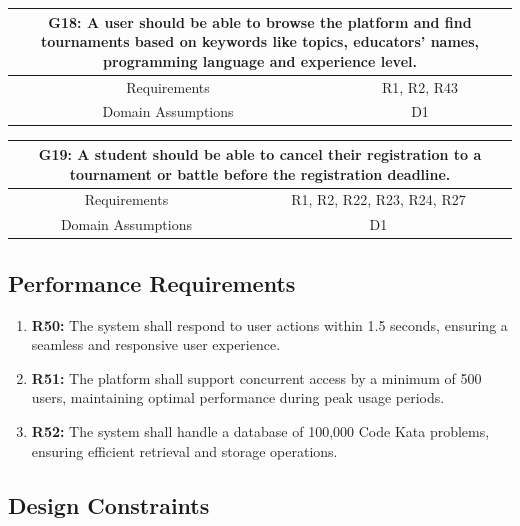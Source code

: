 \documentclass{article}
\begin{document}
\begin{table}[htbp]
    \centering
    \begin{tabular*}{\linewidth}{@{\extracolsep{\fill}} cc }
        \hline
        \multicolumn{2}{|c|}{\parbox{0.9\dimexpr\textwidth-2\tabcolsep\relax}{\centering\textbf{G18: A user should be able to browse the platform and find tournaments based on keywords like topics, educators’ names, programming language and experience level.}}} \\
        \hline
        Requirements & R1, R2, R43\\
        \hline
        Domain Assumptions & D1\\
        \hline
    \end{tabular*}
\end{table}

\begin{table}[htbp]
    \centering
    \begin{tabular*}{\linewidth}{@{\extracolsep{\fill}} cc }
        \hline
        \multicolumn{2}{|c|}{\parbox{0.9\dimexpr\textwidth-2\tabcolsep\relax}{\centering\textbf{G19: A student should be able to cancel their registration to a tournament or battle before the registration deadline.}}} \\
        \hline
        Requirements & R1, R2, R22, R23, R24, R27\\
        \hline
        Domain Assumptions & D1\\
        \hline
    \end{tabular*}
\end{table}


\subsection{Performance Requirements}
\begin{enumerate}
  \item \textbf{R50:} The system shall respond to user actions within 1.5 seconds, ensuring a seamless and responsive user experience.
  \item \textbf{R51:} The platform shall support concurrent access by a minimum of 500 users, maintaining optimal performance during peak usage periods.
  \item \textbf{R52:} The system shall handle a database of 100,000 Code Kata problems, ensuring efficient retrieval and storage operations.
\end{enumerate}

\subsection{Design Constraints}
\end{document}
